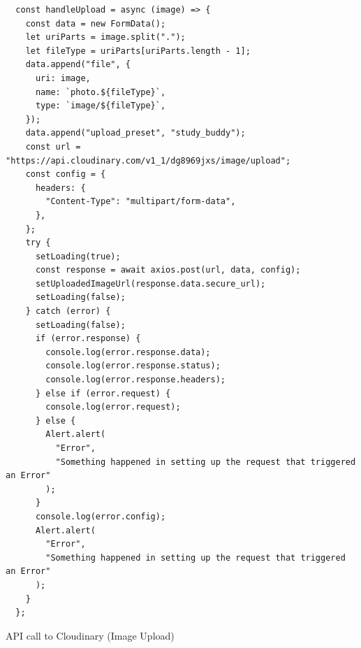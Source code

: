 \begin{listing}[H]
\begin{verbatim} 
  const handleUpload = async (image) => {
    const data = new FormData();
    let uriParts = image.split(".");
    let fileType = uriParts[uriParts.length - 1];
    data.append("file", {
      uri: image,
      name: `photo.${fileType}`,
      type: `image/${fileType}`,
    });
    data.append("upload_preset", "study_buddy");
    const url = "https://api.cloudinary.com/v1_1/dg8969jxs/image/upload";
    const config = {
      headers: {
        "Content-Type": "multipart/form-data",
      },
    };
    try {
      setLoading(true);
      const response = await axios.post(url, data, config);
      setUploadedImageUrl(response.data.secure_url);
      setLoading(false);
    } catch (error) {
      setLoading(false);
      if (error.response) {
        console.log(error.response.data);
        console.log(error.response.status);
        console.log(error.response.headers);
      } else if (error.request) {
        console.log(error.request);
      } else {
        Alert.alert(
          "Error",
          "Something happened in setting up the request that triggered an Error"
        );
      }
      console.log(error.config);
      Alert.alert(
        "Error",
        "Something happened in setting up the request that triggered an Error"
      );
    }
  };
\end{verbatim}
\caption{API call to Cloudinary (Image Upload)}
\label{src:getallotherusers}
\end{listing}

